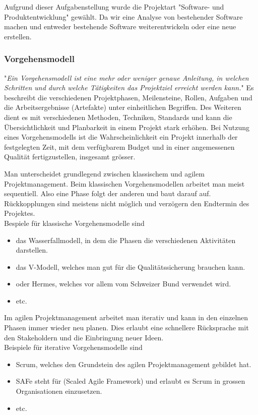 \documentclass[a4paper, table]{article}
\begin{document}
Aufgrund dieser Aufgabenstellung wurde die Projektart "Software- und Produktentwicklung" gewählt. Da wir eine Analyse von bestehender Software machen und
entweder bestehende Software weiterentwickeln oder eine neue erstellen.
\newpage
\subsubsection{Vorgehensmodell}\label{Vorgehensmodell}
"\textit{Ein Vorgehensmodell ist eine mehr oder weniger genaue Anleitung, in welchen Schritten und durch welche Tätigkeiten das Projektziel
erreicht werden kann.}"\autocite{sarre_lufthansa-reservierung_2009}
Es beschreibt die verschiedenen Projektphasen, Meilensteine, Rollen, Aufgaben und die Arbeitsergebnisse (Artefakte) unter einheitlichen Begriffen.
Des Weiteren dient es mit verschiedenen Methoden, Techniken, Standards und kann die Übersichtlichkeit und Planbarkeit in einem Projekt stark erhöhen.
Bei Nutzung eines Vorgehensmodells ist die Wahrscheinlichkeit ein Projekt innerhalb der festgelegten Zeit, mit dem verfügbarem Budget und in einer
angemessenen Qualität fertigzustellen, insgesamt grösser. \autocite{jenny_projektmanagement_2016} %
\newline

Man unterscheidet grundlegend zwischen klassischem und agilem Projektmanagement.
Beim klassischen Vorgehensmodellen arbeitet man meist sequentiell.
Also eine Phase folgt der anderen und baut darauf auf.
Rückkopplungen sind meistens nicht möglich und verzögern den Endtermin des Projektes.\\
Bespiele für klassische Vorgehensmodelle sind
\begin{itemize}
    \item das Wasserfallmodell, in dem die Phasen die verschiedenen Aktivitäten darstellen.
    \item das V-Modell, welches man gut für die Qualitätssicherung brauchen kann.
    \item oder Hermes, welches vor allem vom Schweizer Bund verwendet wird.
    \item etc.
\end{itemize}

Im agilen Projektmanagement arbeitet man iterativ und kann in den einzelnen Phasen immer wieder neu planen.
Dies erlaubt eine schnellere Rücksprache mit den Stakeholdern und die Einbringung neuer Ideen. \\
Beispiele für iterative Vorgehensmodelle sind
\begin{itemize}
    \item Scrum, welches den Grundstein des agilen Projektmanagement gebildet hat.
    \item SAFe steht für (Scaled Agile Framework) und erlaubt es Scrum in grossen Organisationen einzusetzen.
    \item etc. \autocite{noauthor_liste_2022}
\end{itemize}
\end{document}
